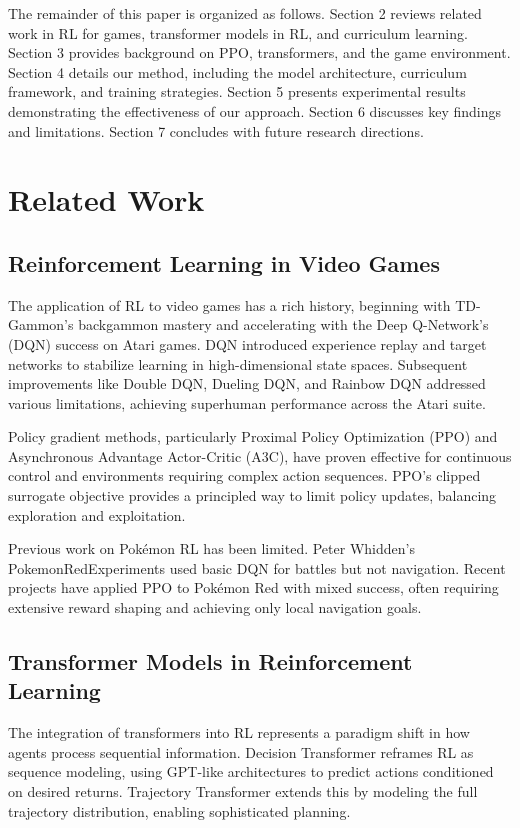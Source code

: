 \documentclass[12pt,a4paper]{article}
\begin{document}
The remainder of this paper is organized as follows. Section 2 reviews related work in RL for games, transformer models in RL, and curriculum learning. Section 3 provides background on PPO, transformers, and the game environment. Section 4 details our method, including the model architecture, curriculum framework, and training strategies. Section 5 presents experimental results demonstrating the effectiveness of our approach. Section 6 discusses key findings and limitations. Section 7 concludes with future research directions.

\section{Related Work}

\subsection{Reinforcement Learning in Video Games}

The application of RL to video games has a rich history, beginning with TD-Gammon's backgammon mastery and accelerating with the Deep Q-Network's (DQN) success on Atari games. DQN introduced experience replay and target networks to stabilize learning in high-dimensional state spaces. Subsequent improvements like Double DQN, Dueling DQN, and Rainbow DQN addressed various limitations, achieving superhuman performance across the Atari suite.

Policy gradient methods, particularly Proximal Policy Optimization (PPO) and Asynchronous Advantage Actor-Critic (A3C), have proven effective for continuous control and environments requiring complex action sequences. PPO's clipped surrogate objective provides a principled way to limit policy updates, balancing exploration and exploitation.

Previous work on Pokémon RL has been limited. Peter Whidden's PokemonRedExperiments used basic DQN for battles but not navigation. Recent projects have applied PPO to Pokémon Red with mixed success, often requiring extensive reward shaping and achieving only local navigation goals.

\subsection{Transformer Models in Reinforcement Learning}

The integration of transformers into RL represents a paradigm shift in how agents process sequential information. Decision Transformer reframes RL as sequence modeling, using GPT-like architectures to predict actions conditioned on desired returns. Trajectory Transformer extends this by modeling the full trajectory distribution, enabling sophisticated planning.
\end{document}
